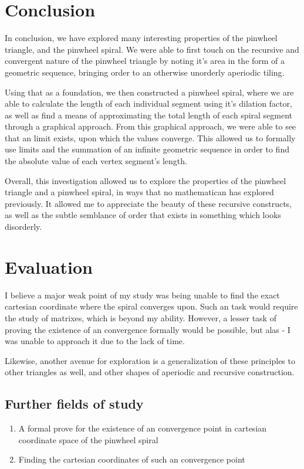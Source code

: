 \section{Conclusion}
In conclusion, we have explored many interesting properties of the pinwheel triangle, and the pinwheel spiral. We were able to first touch on the recursive and convergent nature of the pinwheel triangle by noting it's area in the form of a geometric sequence, bringing order to an otherwise unorderly aperiodic tiling.

Using that as a foundation, we then constructed a pinwheel spiral, where we are able to calculate the length of each individual segment using it's dilation factor, as well as find a means of approximating the total length of each spiral segment through a graphical approach. From this graphical approach, we were able to see that an limit exists, upon which the values converge. This allowed us to formally use limits and the summation of an infinite geometric sequence in order to find the absolute value of each vertex segment's length.

Overall, this investigation allowed us to explore the properties of the pinwheel triangle and a pinwheel spiral, in ways that no mathematican has explored previously. It allowed me to appreciate the beauty of these recursive constructs, as well as the subtle semblance of order that exists in something which looks disorderly.

\section{Evaluation}
I believe a major weak point of my study was being unable to find the exact cartesian coordinate where the spiral converges upon. Such an task would require the study of matrixes, which is beyond my ability. However, a lesser task of proving the existence of an convergence formally would be possible, but alas - I was unable to approach it due to the lack of time.

Likewise, another avenue for exploration is a generalization of these principles to other triangles as well, and other shapes of aperiodic and recursive construction.

\subsection{Further fields of study}
\begin{enumerate}
    \item A formal prove for the existence of an convergence point in cartesian coordinate space of the pinwheel spiral
    \item Finding the cartesian coordinates of such an convergence point
\end{enumerate}
